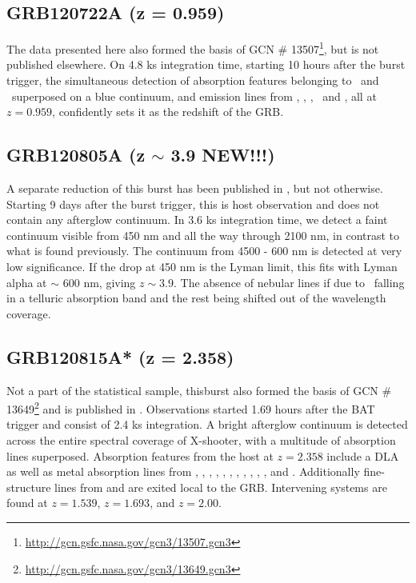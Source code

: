 \documentclass{aa}    %
\begin{document}
\subsection{GRB120722A (z = 0.959)}
The data presented here also formed the basis of GCN \#
13507\footnote{\url{http://gcn.gsfc.nasa.gov/gcn3/13507.gcn3}}, but is not
published elsewhere. On 4.8 ks integration time, starting 10 hours after the
burst trigger, the simultaneous detection of absorption features belonging to
\mgii~and \feii~superposed on a blue continuum, and emission lines from \oii,
\hg, \hb, \oiii~and \ha, all at $z = 0.959$, confidently sets it as the
redshift of the GRB.



\subsection{GRB120805A (z $\sim$ 3.9 NEW!!!)}
A separate reduction of this burst has been published in \citet{Kruhler2015},
but not otherwise. Starting 9 days after the burst trigger, this is host
observation and does not contain any afterglow continuum. In 3.6 ks integration
time, we detect a faint continuum visible from 450 nm and all the way through
2100 nm, in contrast to what is found previously. The continuum from 4500 -
600 nm is detected at very low significance. If the drop at 450 nm is the
Lyman limit, this fits with Lyman alpha at $\sim$ 600 nm, giving $z \sim
3.9$. The absence of nebular lines if due to \oii~falling in a telluric
absorption band and the rest being shifted out of the wavelength coverage.

\subsection{GRB120815A* (z = 2.358)} 
Not a part of the statistical sample, thisburst also formed the basis of  GCN
\# 13649\footnote{\url{http://gcn.gsfc.nasa.gov/gcn3/13649.gcn3}} and is
published in \citet{Kruhler2013}. Observations started 1.69 hours after the BAT
trigger and consist of 2.4 ks integration. A bright afterglow continuum is
detected across the entire spectral coverage of X-shooter, with a multitude of
absorption lines superposed. Absorption features from the host at $z = 2.358$
include a DLA as well as metal absorption lines from \nv, \sii, \SIii, \oi,
\civ, \SIiv, \feii, \alii, \aliii, \mnii, \mgii, and \mgi. Additionally
fine-structure lines from \NIii and \feii are exited local to the GRB.
Intervening systems are found at $z = 1.539$, $z = 1.693$, and $z = 2.00$.
\end{document}
